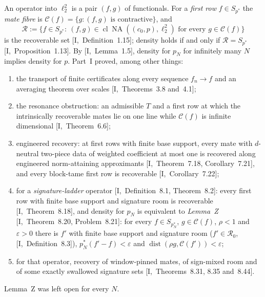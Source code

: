 \documentclass[10pt]{amsart}
\theoremstyle{definition}
\theoremstyle{remark}
\newcommand{\NA}{\operatorname{NA}}
\newcommand{\dist}{\operatorname{dist}}
\newcommand{\Cset}{\mathcal C}
\newcommand{\cl}{\operatorname{cl}}
\newcommand{\Rec}{\mathcal R}
\begin{document}
An operator into $\ell_2^2$ is a pair $(f,g)$ of functionals.  For a
\emph{first row} $f\in S_{p^*}$ the \emph{mate fibre} is
$\Cset(f)=\{g:(f,g)\text{ is contractive}\}$, and
\[
 \Rec:=\{f\in S_{p^*}:\ (f,g)\in\cl\NA((c_0,p),\ell_2^2)\text{ for every }
 g\in\Cset(f)\}
\]
is the recoverable set [I,~Definition~1.15]; density holds if and only if
$\Rec=S_{p^*}$ [I,~Proposition~1.13].  By [I,~Lemma~1.5], density for
$p_N$ for infinitely many $N$ implies density for $p$.  Part~I proved,
among other things:
\begin{enumerate}
\item[(I-1)] the transport of finite certificates along every sequence
$f_n\to f$ and an averaging theorem over scales [I,~Theorems~3.8
and~4.1];
\item[(I-2)] the resonance obstruction: an admissible $T$ and a first row
at which the intrinsically recoverable mates lie on one line while
$\Cset(f)$ is infinite dimensional [I,~Theorem~6.6];
\item[(I-3)] engineered recovery: at first rows with finite base support,
every mate with $d$-neutral two-piece data of weighted coefficient at most
one is recovered along engineered norm-attaining approximants
[I,~Theorem~7.18, Corollary~7.21], and every block-tame first row is
recoverable [I,~Corollary~7.22];
\item[(I-4)] for a \emph{signature-ladder} operator [I,~Definition~8.1,
Theorem~8.2]: every first row with finite base support and signature room
is recoverable [I,~Theorem~8.18], and density for $p_N$ is equivalent to
\emph{Lemma~Z} [I,~Theorem~8.20, Problem~8.21]: for every $f\in
S_{p_N^*}$, $g\in\Cset(f)$, $\rho<1$ and $\varepsilon>0$ there is $f'$ with
finite base support and signature room \textup{(}$f'\in\mathcal R_0$,
[I,~Definition~8.3]\textup{)}, $p_N^*(f'-f)<\varepsilon$ and
$\dist(\rho g,\Cset(f'))<\varepsilon$;
\item[(I-5)] for that operator, recovery of window-pinned mates, of
sign-mixed room and of some exactly swallowed signature sets
[I,~Theorems~8.31, 8.35 and~8.44].
\end{enumerate}
Lemma~Z was left open for every $N$.
\end{document}
